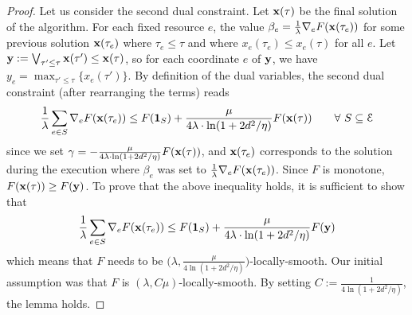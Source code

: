 \begin{proof}
Let us consider the second dual constraint. Let $\mathbf{x}(\tau)$ be the final solution of the algorithm. For each fixed resource $e$, the value $\beta_{e} = \frac{1}{\lambda} \nabla_{e} F(\mathbf{x}(\tau_e))$ for some previous solution $\mathbf{x}(\tau_e)$ where $\tau_e \le \tau$ and where $x_{e}(\tau_e) \leq x_{e}(\tau)$ for all $e$.
Let $\mathbf{y} := \bigvee_{\tau' \le \tau} \mathbf{x}(\tau') \leq \mathbf{x}(\tau)$, so for each coordinate $e$ of $\mathbf{y}$, we have $y_{e} = \max_{\tau' \le \tau}\{x_{e}(\tau')\}$.
By definition of the dual variables, the second dual constraint (after rearranging the terms) reads
\begin{align*}
	\frac{1}{\lambda} \sum_{e \in S} \nabla_{e} F(\mathbf{x}(\tau_e)) \leq F(\mathbf{1}_{S}) + \frac{\mu}{4\lambda \cdot \ln(1+2d^{2}/\eta)} F(\mathbf{x}(\tau)) \quad \quad \forall\ S \subseteq \mathcal{E}
\end{align*}
since we set $\gamma = -\frac{\mu}{4\lambda \cdot \ln(1+2d^{2}/\eta)} F(\mathbf{x}(\tau))$, and $\mathbf{x}(\tau_e)$ corresponds to the solution during the execution where $\beta_e$ was set to $\frac{1}{\lambda} \nabla_{e} F(\mathbf{x}(\tau_e))$.
Since $F$ is monotone, $F(\mathbf{x}(\tau)) \geq F(\mathbf{y})$. To prove that the above inequality holds, it is sufficient to show that
\begin{align*}
	\frac{1}{\lambda} \sum_{e \in S} \nabla_{e} F(\mathbf{x}(\tau_e)) \leq F(\mathbf{1}_{S}) + \frac{\mu}{4\lambda \cdot \ln(1+2d^{2}/\eta)} F(\mathbf{y})
\end{align*}
which means that $F$ needs to be  $\bigl(\lambda, \frac{\mu}{4\ln(1+2d^{2}/\eta)}\bigr)$-locally-smooth. Our initial assumption was that $F$ is $(\lambda, C \mu)$-locally-smooth. By setting $C := \frac{1}{4\ln(1+2d^{2}/\eta)}$, the lemma holds.
\end{proof}

